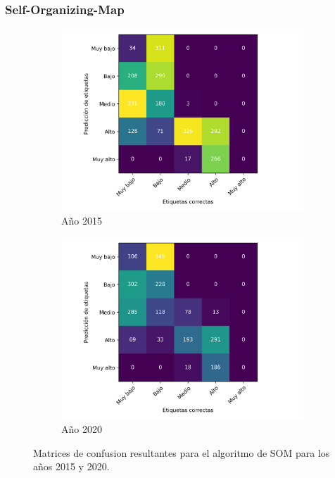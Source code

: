 \subsubsection{Self-Organizing-Map}

\begin{figure}[H]
    \centering
    \begin{subfigure}{8.4cm}
        \includegraphics[width=1\linewidth]{Graphics/Data_2015/SOM_confusion_matrix.png}
        \caption{Año 2015}
    \end{subfigure}
    \begin{subfigure}{8.4cm}
        \includegraphics[width=1\linewidth]{Graphics/Data_2020/SOM_confusion_matrix.png}
        \caption{Año 2020}
    \end{subfigure}
    \caption{Matrices de confusion resultantes para el algoritmo de SOM para los años 2015 y 2020.}
    \label{fig:som}
\end{figure}